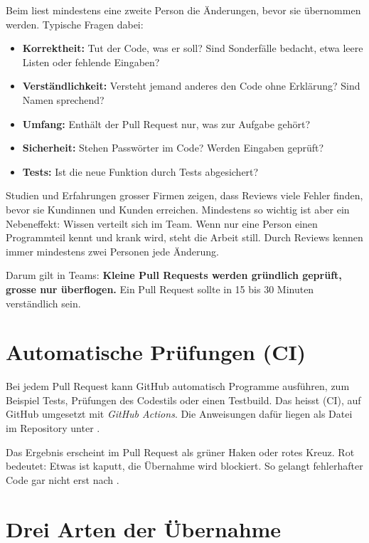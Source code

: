 Beim  liest mindestens eine zweite Person die Änderungen, bevor sie
übernommen werden. Typische Fragen dabei:

\begin{itemize}
  \item \textbf{Korrektheit:} Tut der Code, was er soll? Sind Sonderfälle bedacht, etwa
        leere Listen oder fehlende Eingaben?
  \item \textbf{Verständlichkeit:} Versteht jemand anderes den Code ohne Erklärung?
        Sind Namen sprechend?
  \item \textbf{Umfang:} Enthält der Pull Request nur, was zur Aufgabe gehört?
  \item \textbf{Sicherheit:} Stehen Passwörter im Code? Werden Eingaben geprüft?
  \item \textbf{Tests:} Ist die neue Funktion durch Tests abgesichert?
\end{itemize}

\begin{praxis}
Studien und Erfahrungen grosser Firmen zeigen, dass Reviews viele Fehler finden, bevor sie
Kundinnen und Kunden erreichen. Mindestens so wichtig ist aber ein Nebeneffekt: Wissen
verteilt sich im Team. Wenn nur eine Person einen Programmteil kennt und krank wird, steht
die Arbeit still. Durch Reviews kennen immer mindestens zwei Personen jede Änderung.

Darum gilt in Teams: \textbf{Kleine Pull Requests werden gründlich geprüft, grosse nur
überflogen.} Ein Pull Request sollte in 15 bis 30 Minuten verständlich sein.
\end{praxis}

\section{Automatische Prüfungen (CI)}

Bei jedem Pull Request kann GitHub automatisch Programme ausführen, zum Beispiel Tests,
Prüfungen des Codestils oder einen Testbuild. Das heisst 
(CI), auf GitHub umgesetzt mit \emph{GitHub Actions}. Die Anweisungen dafür liegen als
Datei im Repository unter .

Das Ergebnis erscheint im Pull Request als grüner Haken oder rotes Kreuz. Rot bedeutet:
Etwas ist kaputt, die Übernahme wird blockiert. So gelangt fehlerhafter Code gar nicht erst
nach .

\section{Drei Arten der Übernahme}

